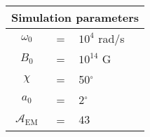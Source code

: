 \begin{tabular}{ccl}
\multicolumn{3}{c}{Simulation parameters} \\
\hline
$\omega_0$  &=& $10^{4}$ rad/s\\
$B_0$  &=& $ 10^{14}$ G \\
$\chi$  &=& 50$^{\circ}$ \\
$a_0$ &=& 2$^{\circ}$ \\
$\mathcal{A}_{\mathrm{EM}}$ &= & $43$
\end{tabular}
